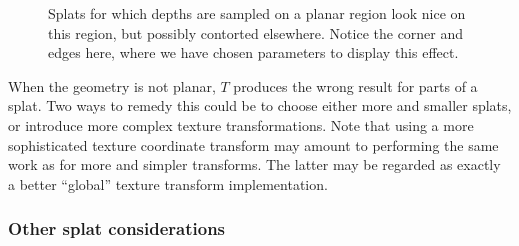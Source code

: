 \begin{figure}[htb]
  \centering
  \caption{\label{fig:LargeSplatsOnCorners}
           Splats for which depths are sampled on a planar region look nice on
  this region, but possibly contorted elsewhere. Notice the corner and edges
  here, where we have chosen parameters to display this effect.}
\end{figure}

When the geometry is not planar, $T$ produces the wrong result for parts of a
splat.  Two ways to remedy this could be to choose either more and smaller
splats, or introduce more complex texture transformations. Note that using a
more sophisticated texture coordinate transform may amount to performing the
same work as for more and simpler transforms. The latter may be regarded as
exactly a better ``global'' texture transform implementation.


\subsubsection{Other splat considerations}
\label{sec:proxyModelReplacement}

